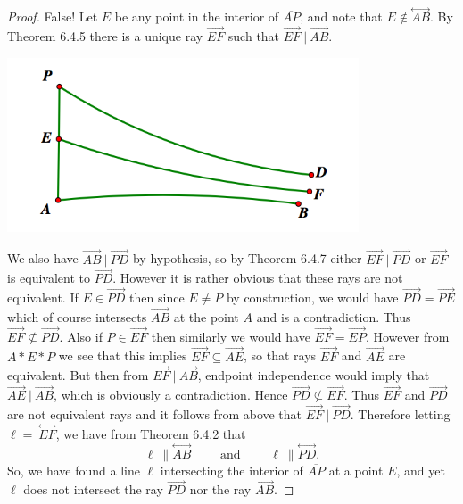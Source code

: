 \documentclass[12pt]{article}
\newcommand{\ray}[1]{\overrightarrow{#1}}
\renewcommand{\line}[1]{\stackrel{\longleftrightarrow}{#1}}
\newcommand{\seg}[1]{\overline{#1}}
\newcommand{\spand}{\qquad\text{ and }\qquad}
\begin{document}
\begin{enumerate}
\begin{enumerate}
\begin{proof} False! Let $E$ be any point in the interior of $\seg{AP}$, and note that $E\notin\line{AB}$. By Theorem 6.4.5 there is a unique ray $\ray{EF}$ such that $\ray{EF} \ | \ \ray{AB}$.

\begin{center}\includegraphics[width=4.1in]{9d.png}\end{center}
We also have $\ray{AB} \ | \ \ray{PD}$ by hypothesis, so by Theorem 6.4.7 either $\ray{EF} \ | \  \ray{PD}$ or $\ray{EF}$ is equivalent to $\ray{PD}$. However it is rather obvious that these rays are not equivalent. If $E\in\ray{PD}$ then since $E\ne P$ by construction, we would have $\ray{PD} = \ray{PE}$ which of course intersects $\ray{AB}$ at the point $A$ and is a contradiction. Thus $\ray{EF} \not\subseteq \ray{PD}$. Also if $P\in\ray{EF}$ then similarly we would have $\ray{EF}=\ray{EP}$. However from $A\ast E\ast P$ we see that this implies $\ray{EF}\subseteq\ray{AE}$, so that rays $\ray{EF}$ and $\ray{AE}$ are equivalent. But then from $\ray{EF} \ | \ \ray{AB}$, endpoint independence would imply that $\ray{AE} \ | \ \ray{AB}$, which is obviously a contradiction. Hence $ \ray{PD} \not\subseteq \ray{EF}$. Thus $\ray{EF}$ and $\ray{PD}$ are not equivalent rays and it follows from above that $\ray{EF} \ | \ \ray{PD}$. Therefore letting $\ell = \ \line{EF}$, we have from Theorem 6.4.2 that $$\ell \ \| \line{AB} \spand \ell \ \| \line{PD}.$$ So, we have found a line $\ell$ intersecting the interior of $\seg{AP}$ at a point $E$, and yet $\ell$ does not intersect the ray $\ray{PD}$ nor the ray $\ray{AB}$.
\end{proof}
\end{enumerate}

\end{enumerate}
\end{document}
